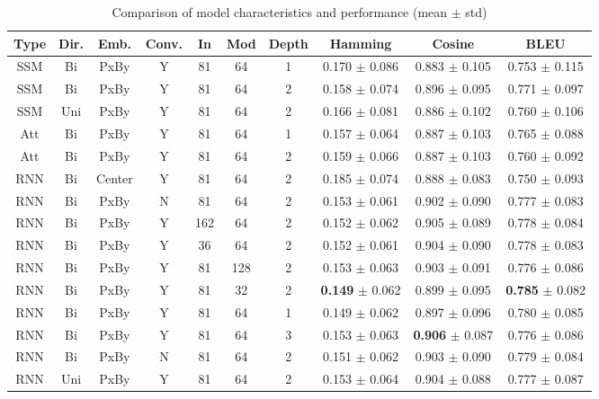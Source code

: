 \documentclass[10pt,a4paper]{article}
\begin{document}
\begin{table}[h]
\centering
\small
\begin{tabular}{cccccccccc}
\hline
Type & Dir. & Emb. & Conv. & In & Mod & Depth & Hamming & Cosine & BLEU \\
\hline
SSM & Bi & PxBy & Y & 81 & 64 & 1 & 0.170 $\pm$ 0.086 & 0.883 $\pm$ 0.105 & 0.753 $\pm$ 0.115 \\
SSM & Bi & PxBy & Y & 81 & 64 & 2 & 0.158 $\pm$ 0.074 & 0.896 $\pm$ 0.095 & 0.771 $\pm$ 0.097 \\
SSM & Uni & PxBy & Y & 81 & 64 & 2 & 0.166 $\pm$ 0.081 & 0.886 $\pm$ 0.102 & 0.760 $\pm$ 0.106 \\
Att & Bi & PxBy & Y & 81 & 64 & 1 & 0.157 $\pm$ 0.064 & 0.887 $\pm$ 0.103 & 0.765 $\pm$ 0.088 \\
Att & Bi & PxBy & Y & 81 & 64 & 2 & 0.159 $\pm$ 0.066 & 0.887 $\pm$ 0.103 & 0.760 $\pm$ 0.092 \\
RNN & Bi & Center & Y & 81 & 64 & 2 & 0.185 $\pm$ 0.074 & 0.888 $\pm$ 0.083 & 0.750 $\pm$ 0.093 \\
RNN & Bi & PxBy & N & 81 & 64 & 2 & 0.153 $\pm$ 0.061 & 0.902 $\pm$ 0.090 & 0.777 $\pm$ 0.083 \\
RNN & Bi & PxBy & Y & 162 & 64 & 2 & 0.152 $\pm$ 0.062 & 0.905 $\pm$ 0.089 & 0.778 $\pm$ 0.084 \\
RNN & Bi & PxBy & Y & 36 & 64 & 2 & 0.152 $\pm$ 0.061 & 0.904 $\pm$ 0.090 & 0.778 $\pm$ 0.083 \\
RNN & Bi & PxBy & Y & 81 & 128 & 2 & 0.153 $\pm$ 0.063 & 0.903 $\pm$ 0.091 & 0.776 $\pm$ 0.086 \\
RNN & Bi & PxBy & Y & 81 & 32 & 2 & \textbf{0.149} $\pm$ 0.062 & 0.899 $\pm$ 0.095 & \textbf{0.785} $\pm$ 0.082 \\
RNN & Bi & PxBy & Y & 81 & 64 & 1 & 0.149 $\pm$ 0.062 & 0.897 $\pm$ 0.096 & 0.780 $\pm$ 0.085 \\
RNN & Bi & PxBy & Y & 81 & 64 & 3 & 0.153 $\pm$ 0.063 & \textbf{0.906} $\pm$ 0.087 & 0.776 $\pm$ 0.086 \\
RNN & Bi & PxBy & N & 81 & 64 & 2 & 0.151 $\pm$ 0.062 & 0.903 $\pm$ 0.090 & 0.779 $\pm$ 0.084 \\
RNN & Uni & PxBy & Y & 81 & 64 & 2 & 0.153 $\pm$ 0.064 & 0.904 $\pm$ 0.088 & 0.777 $\pm$ 0.087 \\
\hline
\end{tabular}
\caption{Comparison of model characteristics and performance (mean $\pm$ std)}
\label{tab:model_comparison}
\end{table}
\end{document}
